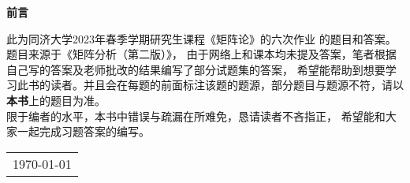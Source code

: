 \def\myDateForeword{\today}

\newpage
\thispagestyle{empty}
\begin{center}
    \Huge\textbf{前言}
\end{center}
\indent 此为同济大学2023年春季学期研究生课程《矩阵论》的六次作业
的题目和答案。题目来源于《矩阵分析（第二版）》，
由于网络上和课本均未提及答案，笔者根据自己写的答案及老师批改的结果编写了部分试题集的答案，
希望能帮助到想要学习此书的读者。并且会在每题的前面标注该题的题源，部分题目与题源不符，请以\textbf{本书}上的题目为准。\\
限于编者的水平，本书中错误与疏漏在所难免，恳请读者不吝指正，
希望能和大家一起完成习题答案的编写。
\begin{flushright}
    \begin{tabular}{c}
        \myDateForeword
    \end{tabular}
\end{flushright}

\newpage
\pagestyle{plain}
\setcounter{page}{1}
\tableofcontents

\newpage
{}
\setcounter{chapter}{0}
\setcounter{page}{1}

\pagestyle{fancy}
\fancyfoot[C]{\thepage}
\renewcommand{\headrulewidth}{0.4pt}
\renewcommand{\footrulewidth}{0pt}
